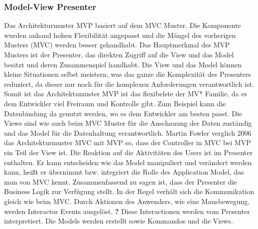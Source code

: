 \setcounter{secnumdepth}{3}
\subsubsection{Model-View Presenter}
Das Architekturmuster \ac{MVP} basiert auf dem \ac{MVC} Muster. Die Komponente wurden anhand hohen Flexibilit\"at angepasst und die M\"angel des vorherigen Musters (\ac{MVC}) werden besser gehandhabt.  Das Hauptmerkmal des \ac{MVP} Musters ist der Presenter, das direkten Zugriff auf die View und das Model besitzt und deren Zusammenspiel handhabt. Die View und das Model k\"onnen kleine Situationen selbst meistern, was das ganze die Komplexit\"at des Presenters reduziert, da dieser nur noch f\"ur die komplexen Anforderungen verantwortlich ist. Somit ist das Architektumuster \ac{MVP} ist das flexibelste der MV* Familie, da es dem Entwickler viel Freiraum und Kontrolle gibt. Zum Beispiel kann die Datenbindung da genutzt werden, wo es dem Entwickler am besten passt\cite{Syromiatnikov2014}.
Die Views sind wie auch beim \ac{MVC} Muster f\"ur die Anschauung der Daten zust\"andig und das Model f\"ur die Datenhaltung verantwortlich. Martin Fowler verglich 2006 das Architekturmuster \ac{MVC} mit \ac{MVP} so, dass der Controller in \ac{MVC} bei  \ac{MVP} ein Teil der View ist\cite{Bragge2013}. Die Reaktion auf die Aktivit\"aten des Users ist im Presenter enthalten. Er kann entscheiden wie das Model manipuliert und ver\"andert werden kann, hei\ss{}t er \"ubernimmt bzw. integriert die Rolle des Application Model, das man von \ac{MVC} kennt. Zusammenfassend zu sagen ist, dass der Presenter die Business Logik zur Verf\"ugung stellt.
In der Regel verh\"alt sich die Kommunikation gleich wie beim \ac{MVC}. Durch Aktionen des Anwenders, wie eine Mausbewegung, werden Interactor Events ausgel\"ost. \textbf{?} Diese Interactionen werden vom Presenter interpretiert. Die Models werden erstellt sowie Kommandos und die Views\cite{Potel1996}.




